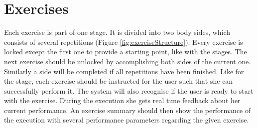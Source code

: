 \section{Exercises}\label{4_4_exercises}
Each exercise is part of one stage. It is divided into two body sides, which consists of several repetitions (Figure \ref{fig:exerciseStructure}). Every exercise is locked except the first one to provide a starting point, like with the stages. The next exercise should be unlocked by accomplishing both sides of the current one. Similarly a side will be completed if all repetitions have been finished. Like for the stage, each exercise should be instructed for the user such that she can successfully perform it. The system will also recognise if the user is ready to start with the exercise. During the execution she gets real time feedback about her current performance. An exercise summary should then show the performance of the execution with several performance parameters regarding the given exercise.

